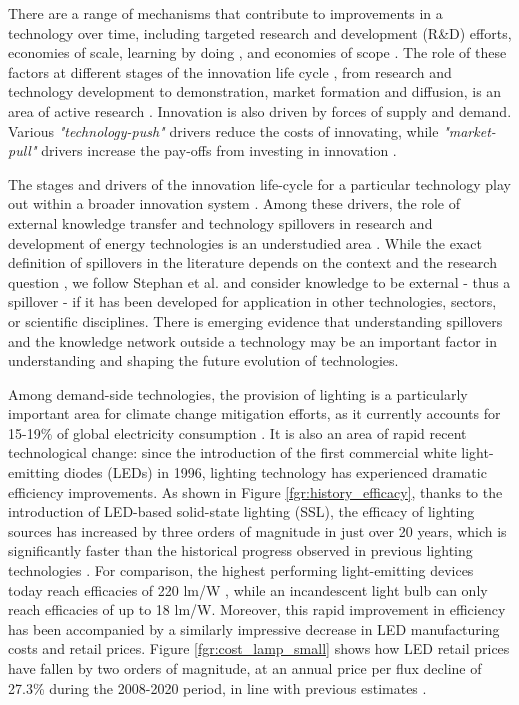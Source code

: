 \documentclass[journal=jacsat,manuscript=article]{achemso}
\begin{document}
There are a range of mechanisms that contribute to improvements in a technology over time, including targeted research and development (R\&D) efforts, economies of scale, learning by doing \cite{Arrow1971}, and economies of scope \cite{johansson2012global,national2016power,iea2020perspectives}. The role of these factors at different stages of the innovation life cycle \cite{ grubler2012policies}, from research and technology development to demonstration, market formation and diffusion, is an area of active research \cite{Mowery1979} \cite{kavlak2018evaluating} \cite{Ziegler2021}. Innovation is also driven by forces of supply and demand. Various \textit{"technology-push"} drivers reduce the costs of innovating, while \textit{"market-pull"} drivers increase the pay-offs from investing in innovation \cite{anadon2009policy}.

The stages and drivers of the innovation life-cycle for a particular technology play out within a broader innovation system \cite{grubler2012policies,Anadon2016}. Among these drivers, the role of external  knowledge transfer and technology spillovers in research and development of energy technologies is an understudied area  \cite{Stephan2021}. While the exact definition of spillovers in the literature depends on the context and the research question \cite{Liu2003,Nemet2012}, we follow Stephan et al. \cite{Stephan2021} and consider knowledge to be external - thus a spillover -  if it has been developed for application in other technologies, sectors, or scientific disciplines. There is emerging evidence that understanding spillovers and the knowledge network outside a technology may be an important factor in understanding \cite{Pichler2020} and shaping \cite{Clark2016,Stephan2021,Sun2021,kolesnikov2022technology} the future evolution of technologies.

Among demand-side technologies, the provision of lighting is a particularly important area for climate change mitigation efforts, as it currently   accounts for 15-19\% of global electricity consumption \cite{Zissis2016,doe_electricity}. It is also an area of rapid recent technological change: since the introduction of the first commercial white light-emitting diodes (LEDs) in 1996, lighting technology has experienced dramatic efficiency improvements.  As shown in Figure \ref{fgr:history_efficacy}, thanks to the introduction of LED-based solid-state lighting (SSL), the efficacy of lighting sources has increased by three orders of magnitude in just over 20 years, which is significantly faster than the historical progress observed in previous lighting technologies \cite{weinold2021quantifying}. For comparison, the highest performing light-emitting devices today reach efficacies of 220 lm/W \cite{lumistrips2021mid}, while an incandescent light bulb can only reach efficacies of up to 18 lm/W. Moreover, this rapid improvement in efficiency has been accompanied by a similarly impressive decrease in LED manufacturing costs and retail prices. Figure \ref{fgr:cost_lamp_small} shows how LED retail prices have fallen by two orders of magnitude, at an annual price per flux decline of 27.3\% during the 2008-2020 period, in line with previous estimates \cite{Gerke2020}.
\end{document}
